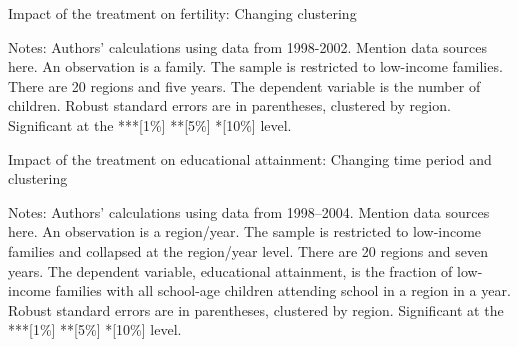 \documentclass[12pt,a4paper]{article}
\begin{document}
\begin{footnotesize}
\begin{table}[H]
   \centering
   \caption{Impact of the treatment on fertility: Changing clustering} \label{tab:table5}
   \begin{threeparttable}
         \footnotesize 
     
        \begin{tablenotes}
        \scriptsize 
        \item{Notes: Authors’ calculations using data from 1998-2002. Mention data sources here. An observation is a family. The sample is restricted to low-income families. There are 20 regions and five years. The dependent variable is the number of children. Robust standard errors are in parentheses, clustered by region. Significant at the ***[1\%] **[5\%] *[10\%] level.
}
        \end{tablenotes}  
   \end{threeparttable}                          
\end{table}


\begin{table}[H]
   \centering
   \caption{Impact of the treatment on educational attainment: Changing time period and clustering} \label{tab:table6}
   \begin{threeparttable}
         \footnotesize 
     
        \begin{tablenotes}
        \scriptsize 
        \item{Notes: Authors’ calculations using data from 1998--2004. Mention data sources here. An observation is a region/year. The sample is restricted to low-income families and collapsed at the region/year level. There are 20 regions and seven years. The dependent variable, educational attainment, is the fraction of low-income families with all school-age children attending school in a region in a year. Robust standard errors are in parentheses, clustered by region. Significant at the ***[1\%] **[5\%] *[10\%] level.
}
        \end{tablenotes}  
   \end{threeparttable}                          
\end{table}



\end{footnotesize}
\end{document}
